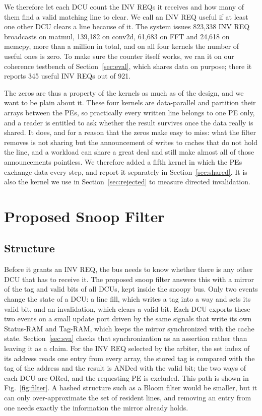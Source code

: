\documentclass[conference]{IEEEtran}
\begin{document}
We therefore let each DCU count the INV REQs it receives and how many of them
find a valid matching line to clear. We call an INV REQ useful if at least
one other DCU clears a line because of it. The system issues 823{,}338
INV REQ broadcasts on matmul, 139{,}182 on conv2d, 61{,}683 on FFT and
24{,}618 on memcpy, more than a million in total, and on all four kernels the
number of useful ones is zero. To make sure the counter itself works, we ran
it on our coherence testbench of Section~\ref{sec:eval}, which shares data on
purpose; there it reports 345 useful INV REQs out of 921.

The zeros are thus a property of the kernels as much as of the design, and we
want to be plain about it. These four kernels are data-parallel and partition
their arrays between the PEs, so practically every written line belongs to one
PE only, and a reader is entitled to ask whether the result survives once the
data really is shared. It does, and for a reason that the zeros make easy to
miss: what the filter removes is not sharing but the announcement of writes to
caches that do not hold the line, and a workload can share a great deal and
still make almost all of those announcements pointless. We therefore added a
fifth kernel in which the PEs exchange data every step, and report it
separately in Section~\ref{sec:shared}. It is also the kernel we use in
Section~\ref{sec:rejected} to measure directed invalidation.

\section{Proposed Snoop Filter}
\label{sec:filter}

\subsection{Structure}

Before it grants an INV REQ, the bus needs to know whether there is any other
DCU that has to receive it. The proposed snoop filter answers this with a
mirror of the tag and valid bits of all DCUs, kept inside the snoopy bus. Only
two events change the state of a DCU: a line fill, which writes a tag into a
way and sets its valid bit, and an invalidation, which clears a valid bit.
Each DCU exports these two events on a small update port driven by the same
signals that write its own Status-RAM and Tag-RAM, which keeps the mirror
synchronized with the cache state. Section~\ref{sec:sva} checks that
synchronization as an assertion rather than leaving it as a claim. For the
INV REQ selected by the arbiter, the
set index of its address reads one entry from every array, the stored tag is
compared with the tag of the address and the result is ANDed with the valid
bit; the two ways of each DCU are ORed, and the requesting PE is excluded.
This path is shown in Fig.~\ref{fig:filter}. A hashed structure such as a
Bloom filter would be smaller, but it can only over-approximate the set of
resident lines, and removing an entry from one needs exactly the information
the mirror already holds.
\end{document}
